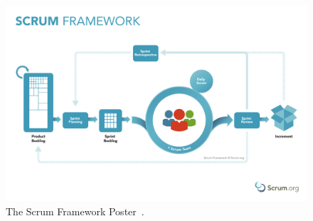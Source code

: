 \documentclass[12pt,a4paper]{article}
\theoremstyle{definition}
\begin{document}
    \begin{figure}[H]
        \centering
        \includegraphics[scale=0.4]{img/ScrumFramework.pdf}
        \caption{The Scrum Framework Poster~\cite{ScrumOrgPoster}.}
        \label{fig:ScrumOrgPoster}
    \end{figure}
\end{document}
